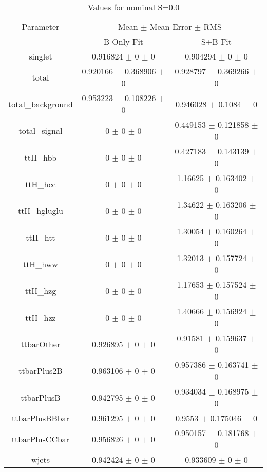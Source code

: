 \begin{table}
\centering
\caption{Values for nominal S=0.0}
\begin{tabular}{ccc}
\toprule
Parameter & \multicolumn{2}{c}{Mean $\pm$ Mean Error $\pm$ RMS}\\
 & B-Only Fit & S+B Fit\\
\midrule
singlet & \num{0.916824} $\pm$ \num{0} $\pm$ \num{0} & \num{0.904294} $\pm$ \num{0} $\pm$ \num{0}\\
total & \num{0.920166} $\pm$ \num{0.368906} $\pm$ \num{0} & \num{0.928797} $\pm$ \num{0.369266} $\pm$ \num{0}\\
total\_background & \num{0.953223} $\pm$ \num{0.108226} $\pm$ \num{0} & \num{0.946028} $\pm$ \num{0.1084} $\pm$ \num{0}\\
total\_signal & \num{0} $\pm$ \num{0} $\pm$ \num{0} & \num{0.449153} $\pm$ \num{0.121858} $\pm$ \num{0}\\
ttH\_hbb & \num{0} $\pm$ \num{0} $\pm$ \num{0} & \num{0.427183} $\pm$ \num{0.143139} $\pm$ \num{0}\\
ttH\_hcc & \num{0} $\pm$ \num{0} $\pm$ \num{0} & \num{1.16625} $\pm$ \num{0.163402} $\pm$ \num{0}\\
ttH\_hgluglu & \num{0} $\pm$ \num{0} $\pm$ \num{0} & \num{1.34622} $\pm$ \num{0.163206} $\pm$ \num{0}\\
ttH\_htt & \num{0} $\pm$ \num{0} $\pm$ \num{0} & \num{1.30054} $\pm$ \num{0.160264} $\pm$ \num{0}\\
ttH\_hww & \num{0} $\pm$ \num{0} $\pm$ \num{0} & \num{1.32013} $\pm$ \num{0.157724} $\pm$ \num{0}\\
ttH\_hzg & \num{0} $\pm$ \num{0} $\pm$ \num{0} & \num{1.17653} $\pm$ \num{0.157524} $\pm$ \num{0}\\
ttH\_hzz & \num{0} $\pm$ \num{0} $\pm$ \num{0} & \num{1.40666} $\pm$ \num{0.156924} $\pm$ \num{0}\\
ttbarOther & \num{0.926895} $\pm$ \num{0} $\pm$ \num{0} & \num{0.91581} $\pm$ \num{0.159637} $\pm$ \num{0}\\
ttbarPlus2B & \num{0.963106} $\pm$ \num{0} $\pm$ \num{0} & \num{0.957386} $\pm$ \num{0.163741} $\pm$ \num{0}\\
ttbarPlusB & \num{0.942795} $\pm$ \num{0} $\pm$ \num{0} & \num{0.934034} $\pm$ \num{0.168975} $\pm$ \num{0}\\
ttbarPlusBBbar & \num{0.961295} $\pm$ \num{0} $\pm$ \num{0} & \num{0.9553} $\pm$ \num{0.175046} $\pm$ \num{0}\\
ttbarPlusCCbar & \num{0.956826} $\pm$ \num{0} $\pm$ \num{0} & \num{0.950157} $\pm$ \num{0.181768} $\pm$ \num{0}\\
wjets & \num{0.942424} $\pm$ \num{0} $\pm$ \num{0} & \num{0.933609} $\pm$ \num{0} $\pm$ \num{0}\\
\bottomrule
\end{tabular}
\end{table}